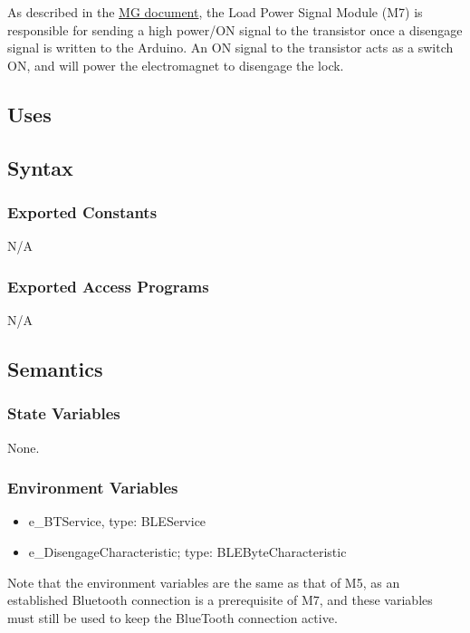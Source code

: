 \documentclass[12pt, titlepage]{article}
\begin{document}
As described in the \href{https://github.com/NevoAbigail/Capstone/blob/main/docs/Design/SoftArchitecture/MG.pdf}{MG document}, the Load Power Signal Module (M7) is responsible for sending a high power/ON signal to the transistor once a disengage signal is written to the Arduino. An ON signal to the transistor acts as a switch ON, and will power the electromagnet to disengage the lock. 

\subsection{Uses}

\subsection{Syntax}

\subsubsection{Exported Constants}

N/A

\subsubsection{Exported Access Programs}

N/A

\subsection{Semantics}

\subsubsection{State Variables}

None.

\subsubsection{Environment Variables}

\begin{itemize}
\item e\_BTService, type: BLEService
\item e\_DisengageCharacteristic; type: BLEByteCharacteristic
\end{itemize}

Note that the environment variables are the same as that of M5, as an established Bluetooth connection is a prerequisite of M7, and these variables must still be used to keep the BlueTooth connection active. 
\end{document}

